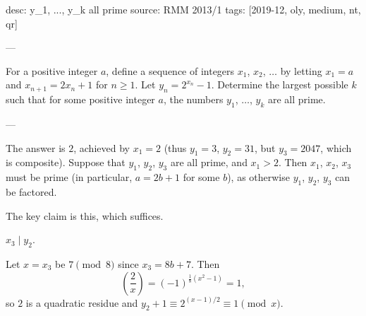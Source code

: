 desc: y_1, ..., y_k all prime
source: RMM 2013/1
tags: [2019-12, oly, medium, nt, qr]

---

For a positive integer $a$, define a sequence of integers $x_1$, $x_2$, $\ldots$ by letting $x_1=a$ and $x_{n+1}=2x_n+1$ for $n\ge1$. Let $y_n=2^{x_n}-1$. Determine the largest possible $k$ such that for some positive integer $a$, the numbers $y_1$, $\ldots$, $y_k$ are all prime.

---

The answer is $2$, achieved by $x_1=2$ (thus $y_1=3$, $y_2=31$, but $y_3=2047$, which is composite). Suppose that $y_1$, $y_2$, $y_3$ are all prime, and $x_1>2$. Then $x_1$, $x_2$, $x_3$ must be prime (in particular, $a=2b+1$ for some $b$), as otherwise $y_1$, $y_2$, $y_3$ can be factored.

The key claim is this, which suffices.
\begin{claim*}
    $x_3\mid y_2$.
\end{claim*}
Let $x=x_3$ be $7\pmod8$ since $x_3=8b+7$. Then \[\left(\frac2x\right)=(-1)^{\frac18(x^2-1)}=1,\]
so $2$ is a quadratic residue and $y_2+1\equiv2^{(x-1)/2}\equiv1\pmod x$.
